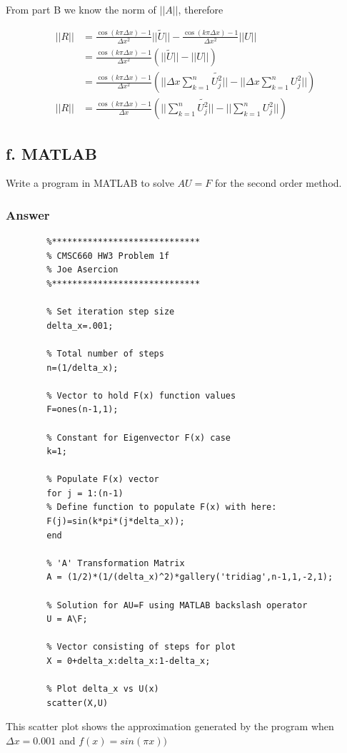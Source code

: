 \documentclass{article}
\begin{document}
		From part B we know the norm of $||A||$, therefore
		
		\begin{align*}
			||R||&=\frac{\cos(k\pi\Delta x)-1}{\Delta x^{2}}||\tilde{U}||-\frac{\cos(k\pi\Delta x)-1}{\Delta x^{2}}||U||\\
			&=\frac{\cos(k\pi\Delta x)-1}{\Delta x^{2}}(||\tilde{U}||-||U||)\\
			&=\frac{\cos(k\pi\Delta x)-1}{\Delta x^{2}}(||\Delta x\sum_{k=1}^{n}\tilde{U_{j}^{2}}||-||\Delta x\sum_{k=1}^{n}U_{j}^{2}||)\\
			||R||&=\frac{\cos(k\pi\Delta x)-1}{\Delta x}(||\sum_{k=1}^{n}\tilde{U_{j}^{2}}||-||\sum_{k=1}^{n}U_{j}^{2}||)
		\end{align*}
	\newpage
	\subsection{f. MATLAB}
		Write a program in MATLAB to solve $AU=F$ for the second order method.
		\subsubsection{Answer}
		\begin{lstlisting}
		%*****************************
		% CMSC660 HW3 Problem 1f
		% Joe Asercion
		%***************************** 
		
		% Set iteration step size
		delta_x=.001;
		
		% Total number of steps
		n=(1/delta_x);
		
		% Vector to hold F(x) function values
		F=ones(n-1,1);
		
		% Constant for Eigenvector F(x) case
		k=1;
		
		% Populate F(x) vector
		for j = 1:(n-1)
		% Define function to populate F(x) with here:
		F(j)=sin(k*pi*(j*delta_x));
		end
		
		% 'A' Transformation Matrix
		A = (1/2)*(1/(delta_x)^2)*gallery('tridiag',n-1,1,-2,1);
		
		% Solution for AU=F using MATLAB backslash operator
		U = A\F;
		
		% Vector consisting of steps for plot
		X = 0+delta_x:delta_x:1-delta_x;
		
		% Plot delta_x vs U(x)
		scatter(X,U)
		\end{lstlisting}
		This scatter plot shows the approximation generated by the program when $\Delta x=0.001$ and $f(x)=sin(\pi x))$
		
\end{document}
